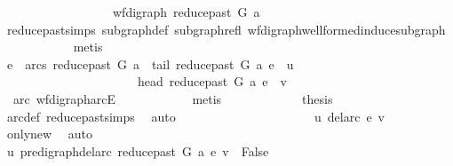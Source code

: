 \begin{isabellebody}
\ \ \ \ \ \ \isamarkupfalse%
\ {\isacharminus}{\kern0pt}\isanewline
\ \ \ \ \ \ \ \ \isamarkupfalse%
\ {\isachardoublequoteopen}wf{\isacharunderscore}{\kern0pt}digraph\ {\isacharparenleft}{\kern0pt}reduce{\isacharunderscore}{\kern0pt}past\ G\ a{\isacharparenright}{\kern0pt}{\isachardoublequoteclose}\isanewline
\ \ \ \ \ \ \ \ \ \ \isamarkupfalse%
\ reduce{\isacharunderscore}{\kern0pt}past{\isachardot}{\kern0pt}simps\ subgraph{\isacharunderscore}{\kern0pt}def\ subgraph{\isacharunderscore}{\kern0pt}refl\ wf{\isacharunderscore}{\kern0pt}digraph{\isachardot}{\kern0pt}wellformed{\isacharunderscore}{\kern0pt}induce{\isacharunderscore}{\kern0pt}subgraph\isanewline
\ \ \ \ \ \ \ \ \ \ \isamarkupfalse%
\ metis\isanewline
\ \ \ \ \ \ \ \ \isamarkupfalse%
\ \isamarkupfalse%
\ {\isachardoublequoteopen}e\ {\isasymin}\ arcs\ {\isacharparenleft}{\kern0pt}reduce{\isacharunderscore}{\kern0pt}past\ G\ a{\isacharparenright}{\kern0pt}\ {\isasymand}\ tail\ {\isacharparenleft}{\kern0pt}reduce{\isacharunderscore}{\kern0pt}past\ G\ a{\isacharparenright}{\kern0pt}\ e\ {\isacharequal}{\kern0pt}\ u\isanewline
\ \ \ \ \ \ \ \ \ \ \ \ \ \ \ \ \ \ \ \ \ {\isasymand}\ head\ {\isacharparenleft}{\kern0pt}reduce{\isacharunderscore}{\kern0pt}past\ G\ a{\isacharparenright}{\kern0pt}\ e\ {\isacharequal}{\kern0pt}\ v{\isachardoublequoteclose}\isanewline
\ \ \ \ \ \ \ \ \ \ \isamarkupfalse%
\ \ arc\ wf{\isacharunderscore}{\kern0pt}digraph{\isachardot}{\kern0pt}arcE\isanewline
\ \ \ \ \ \ \ \ \ \ \isamarkupfalse%
\ metis\ \isanewline
\ \ \ \ \ \ \ \ \isamarkupfalse%
\ \isamarkupfalse%
\ {\isacharquery}{\kern0pt}thesis\isanewline
\ \ \ \ \ \ \ \ \ \ \isamarkupfalse%
\ arc{\isacharunderscore}{\kern0pt}def\ reduce{\isacharunderscore}{\kern0pt}past{\isachardot}{\kern0pt}simps\ \isamarkupfalse%
\ auto\isanewline
\ \ \ \ \ \ \isamarkupfalse%
\ \ \ \ \isanewline
\ \ \ \ \ \ \isamarkupfalse%
\ \isamarkupfalse%
\ {\isachardoublequoteopen}{\isasymnot}\ u\ {\isasymrightarrow}\isactrlsup {\isacharplus}{\kern0pt}\isactrlbsub del{\isacharunderscore}{\kern0pt}arc\ e\isactrlesub \ v{\isachardoublequoteclose}\isanewline
\ \ \ \ \ \ \ \ \isamarkupfalse%
\ only{\isacharunderscore}{\kern0pt}new\ \isamarkupfalse%
\ auto\ \ \ \ \ \ \ \ \isanewline
\ \ \ \ \ \ \isamarkupfalse%
\ \isamarkupfalse%
\ {\isachardoublequoteopen}u\ {\isasymrightarrow}\isactrlsup {\isacharplus}{\kern0pt}\isactrlbsub pre{\isacharunderscore}{\kern0pt}digraph{\isachardot}{\kern0pt}del{\isacharunderscore}{\kern0pt}arc\ {\isacharparenleft}{\kern0pt}reduce{\isacharunderscore}{\kern0pt}past\ G\ a{\isacharparenright}{\kern0pt}\ e\isactrlesub \ v\ {\isasymLongrightarrow}\ False{\isachardoublequoteclose}\isanewline

\end{isabellebody}
